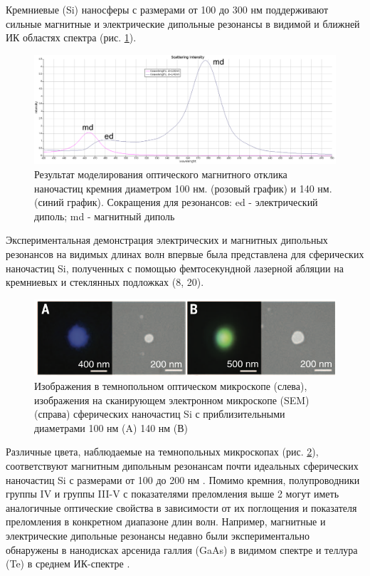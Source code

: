 Кремниевые (Si) наносферы с размерами от 100 до 300 нм поддерживают сильные магнитные и электрические дипольные резонансы в видимой и ближней ИК областях спектра (рис. \ref{fig2}). 
 \begin{figure}[h!]
	\centering
	\includegraphics[width=0.7\linewidth]{images/graph1.png}
	\caption{Результат моделирования оптического магнитного отклика наночастиц кремния  диаметром 100 нм. (розовый график) и 140 нм. (синий график).  Сокращения для резонансов: ed - электрический диполь; md - магнитный диполь}
	\label{fig2}
\end{figure}
Экспериментальная демонстрация электрических и магнитных дипольных резонансов на видимых длинах волн впервые была представлена для сферических наночастиц Si, полученных с помощью фемтосекундной лазерной абляции на кремниевых и стеклянных подложках (8, 20). 
 \begin{figure}[h!]
	\centering
	\includegraphics[width=0.7\linewidth]{images/fig2.png}
	\caption{ Изображения в темнопольном оптическом микроскопе (слева), изображения на сканирующем электронном микроскопе (SEM) (справа)  сферических наночастиц Si с приблизительными диаметрами 100 нм (A) 140 нм (В)  \cite{kuznetsov2012luk}}
	\label{fig3}
\end{figure}
\hspace*{2mm}Различные цвета, наблюдаемые на темнопольных микроскопах (рис. \ref{fig3}), соответствуют магнитным дипольным резонансам почти идеальных сферических наночастиц Si с размерами от 100 до 200 нм \cite{kuznetsov2012luk}.  Помимо кремния, полупроводники группы IV и группы III-V с показателями преломления выше 2 могут иметь аналогичные оптические свойства в зависимости от их поглощения и показателя преломления в конкретном диапазоне длин волн. Например, магнитные и электрические дипольные резонансы недавно были экспериментально обнаружены в нанодисках арсенида галлия (GaAs) в видимом спектре \cite{person2013demonstration} и теллура (Te) в среднем ИК-спектре .



